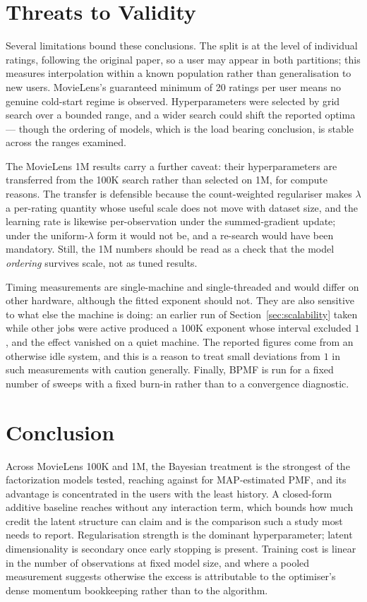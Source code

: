 \documentclass[conference]{IEEEtran}
\begin{document}
\section{Threats to Validity}
\label{sec:limitations}

Several limitations bound these conclusions. The split is at the level of individual
ratings, following the original paper, so a user may appear in both partitions; this
measures interpolation within a known population rather than generalisation to new users.
MovieLens's guaranteed minimum of 20 ratings per user means no genuine cold-start regime is
observed. Hyperparameters were selected by grid search over a bounded range, and a wider
search could shift the reported optima --- though the ordering of models, which is the load
bearing conclusion, is stable across the ranges examined.

The MovieLens 1M results carry a further caveat: their hyperparameters are transferred from
the 100K search rather than selected on 1M, for compute reasons. The transfer is
defensible because the count-weighted regulariser makes $\lambda$ a per-rating quantity
whose useful scale does not move with dataset size, and the learning rate is likewise
per-observation under the summed-gradient update; under the uniform-$\lambda$ form it would
not be, and a re-search would have been mandatory. Still, the 1M numbers should be read as
a check that the model \emph{ordering} survives scale, not as tuned results.

Timing measurements are single-machine and single-threaded and would differ on other
hardware, although the fitted exponent should not. They are also sensitive to what else the
machine is doing: an earlier run of Section~\ref{sec:scalability} taken while other jobs
were active produced a 100K exponent whose interval excluded $1$, and the effect vanished
on a quiet machine. The reported figures come from an otherwise idle system, and this is a
reason to treat small deviations from $1$ in such measurements with caution generally. Finally, BPMF is run for a fixed number
of sweeps with a fixed burn-in rather than to a convergence diagnostic.

\section{Conclusion}

Across MovieLens 100K and 1M, the Bayesian treatment is the strongest of the factorization
models tested, reaching \BestRMSE{} against \PMFRMSE{} for MAP-estimated PMF, and its
advantage is concentrated in the users with the least history. A closed-form additive
baseline reaches \BiasBaselineRMSE{} without any interaction term, which bounds how much
credit the latent structure can claim and is the comparison such a study most needs to
report. Regularisation strength is the dominant hyperparameter; latent dimensionality is
secondary once early stopping is present. Training cost is linear in the number of
observations at fixed model size, and where a pooled measurement suggests otherwise the
excess is attributable to the optimiser's dense momentum bookkeeping rather than to the
algorithm.
\end{document}
